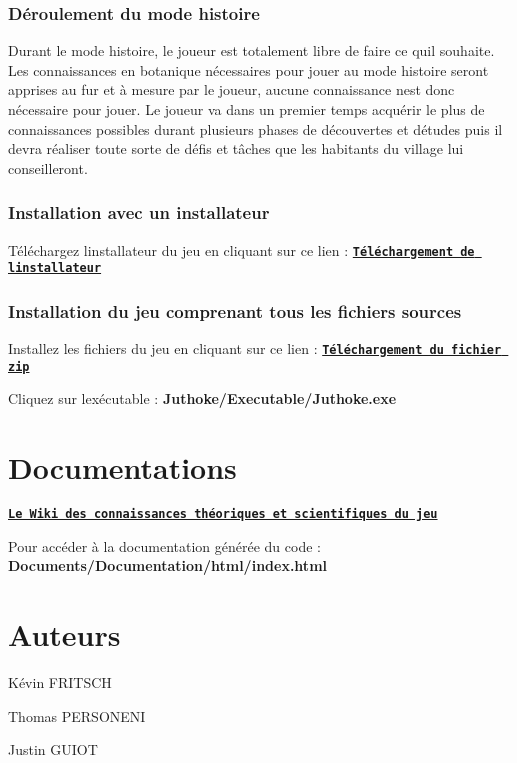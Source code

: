 \subsubsection*{Déroulement du mode histoire}

Durant le mode histoire, le joueur est totalement libre de faire ce qu\textquotesingle{}il souhaite. Les connaissances en botanique nécessaires pour jouer au mode histoire seront apprises au fur et à mesure par le joueur, aucune connaissance n\textquotesingle{}est donc nécessaire pour jouer. Le joueur va dans un premier temps acquérir le plus de connaissances possibles durant plusieurs phases de découvertes et d\textquotesingle{}études puis il devra réaliser toute sorte de défis et tâches que les habitants du village lui conseilleront.

\subsubsection*{Installation avec un installateur}


\begin{DoxyItemize}
\item Téléchargez l\textquotesingle{}installateur du jeu en cliquant sur ce lien \+: {\bfseries \href{https://git.unistra.fr/T432_DIP18_T3_C/Juthoke/raw/master/Installation_Plantventure.exe}{\tt Téléchargement de l\textquotesingle{}installateur}}
\end{DoxyItemize}

\subsubsection*{Installation du jeu comprenant tous les fichiers sources}


\begin{DoxyItemize}
\item Installez les fichiers du jeu en cliquant sur ce lien \+: {\bfseries \href{https://git.unistra.fr/T432_DIP18_T3_C/Juthoke/-/archive/master/Juthoke-master.zip}{\tt Téléchargement du fichier zip}}
\item Cliquez sur l\textquotesingle{}exécutable \+: {\bfseries Juthoke/\+Executable/{\ttfamily Juthoke.\+exe}}
\end{DoxyItemize}

\section*{Documentations}


\begin{DoxyItemize}
\item {\bfseries \href{https://git.unistra.fr/T432_DIP18_T3_C/Juthoke/wikis/Wiki-:-Plantventure}{\tt Le Wiki des connaissances théoriques et scientifiques du jeu}}
\item Pour accéder à la documentation générée du code \+: {\bfseries Documents/\+Documentation/html/{\ttfamily index.\+html}}
\end{DoxyItemize}

\section*{Auteurs}


\begin{DoxyItemize}
\item Kévin F\+R\+I\+T\+S\+CH
\item Thomas P\+E\+R\+S\+O\+N\+E\+NI
\item Justin G\+U\+I\+OT 
\end{DoxyItemize}